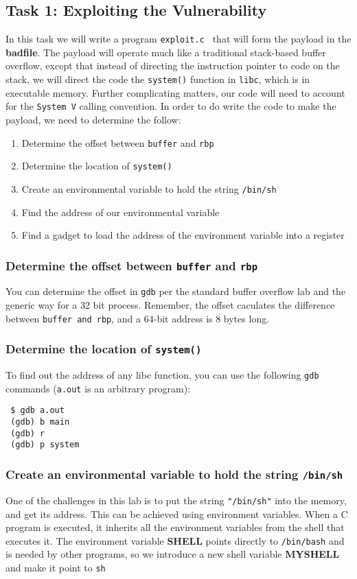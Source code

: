 \subsection{Task 1: Exploiting the Vulnerability} 
In this task we will write a program {\tt exploit.c } that will form the payload in the \textbf{badfile}. The payload will operate much like a traditional stack-based buffer overflow, except that instead of directing the instruction pointer to code on the stack, we will direct the code the {\tt system()} function in {\tt libc}, which is in executable memory.  Further complicating matters, our code will need to account for the {\tt System V} calling convention. In order to do write the code to make the payload, we need to determine the follow:
\begin{enumerate}
    \item Determine the offset between {\tt buffer} and {\tt rbp}
    \item Determine the location of {\tt system()}
    \item Create an environmental variable to hold the string {\tt /bin/sh}
    \item Find the address of our environmental variable
    \item Find a gadget to load the address of the environment variable into a register
\end{enumerate}

\subsubsection{Determine the offset between {\tt buffer} and {\tt rbp}}
You can determine the offset in {\tt gdb} per the standard buffer overflow lab and the generic way for a 32 bit process.  Remember, the offset caculates the difference between {\tt buffer and rbp}, and a 64-bit address is 8 bytes long.

\subsubsection{Determine the location of {\tt system()}}
To find out the address of any libc function, you can use the following
{\tt gdb} commands ({\tt a.out} is an arbitrary program):
\begin{verbatim}
 $ gdb a.out
 (gdb) b main
 (gdb) r
 (gdb) p system
\end{verbatim}

\subsubsection{Create an environmental variable to hold the string {\tt /bin/sh}}
One of the challenges in this lab is to put the string {\tt "/bin/sh"}
into the memory, and get its address. This can be achieved using 
environment variables.
When a C program is executed, it inherits all the environment variables from
the shell that executes it. The environment variable \textbf{SHELL} points
directly to \texttt{/bin/bash} and is needed by other programs, so we introduce
a new shell variable \textbf{MYSHELL} and make it point to \texttt{sh} \\

